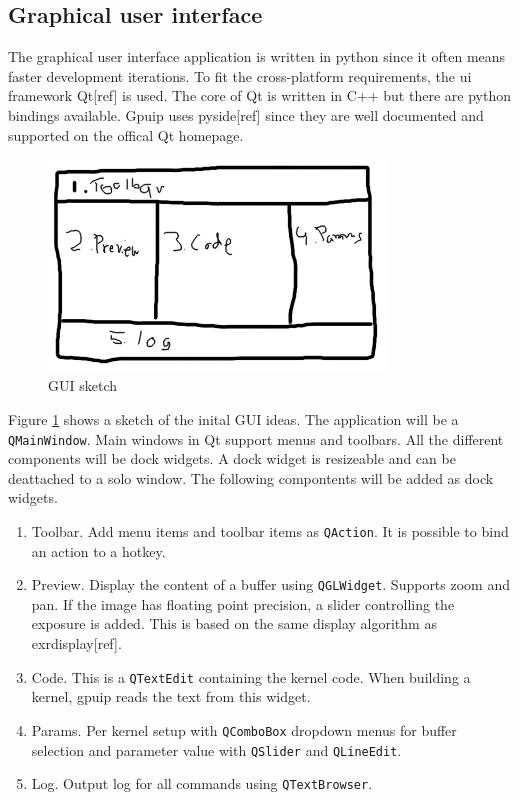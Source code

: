 \subsection{Graphical user interface}

The graphical user interface application is written in python since it often means faster development iterations. To fit the cross-platform requirements, the ui framework Qt[ref] is used. The core of Qt is written in C++ but there are python bindings available. Gpuip uses pyside[ref] since they are well documented and supported on the offical Qt homepage. 
\newline

\begin{figure}[ht!]
\centering
\includegraphics[width=90mm]{img/gui.png}
\caption{GUI sketch}
\label{guisketch}
\end{figure}

Figure \ref{guisketch} shows a sketch of the inital GUI ideas. The application will be a {\tt QMainWindow}. Main windows in Qt support menus and toolbars. All the different components will be dock widgets. A dock widget is resizeable and can be deattached to a solo window. The following compontents will be added as dock widgets.

\begin{enumerate}
\item Toolbar. Add menu items and toolbar items as {\tt QAction}. It is possible to bind an action to a hotkey.
\item Preview. Display the content of a buffer using {\tt QGLWidget}. Supports zoom and pan. If the image has floating point precision, a slider controlling the exposure is added. This is based on the same display algorithm as exrdisplay[ref].
\item Code. This is a {\tt QTextEdit} containing the kernel code. When building a kernel, gpuip reads the text from this widget.
\item Params. Per kernel setup with {\tt QComboBox} dropdown menus for buffer selection and parameter value with {\tt QSlider} and {\tt QLineEdit}.
\item Log. Output log for all commands using {\tt QTextBrowser}.
\end{enumerate}
